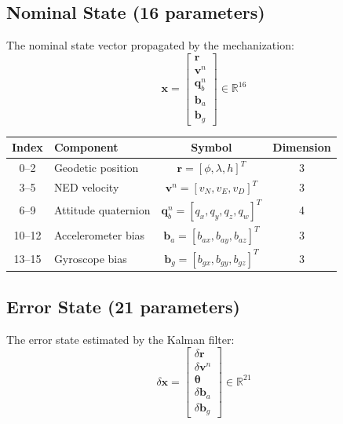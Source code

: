 \documentclass[11pt,a4paper]{article}
\newcommand{\mat}[1]{\mathbf{#1}}
\newcommand{\vect}[1]{\boldsymbol{#1}}
\newcommand{\quat}[1]{\mathbf{#1}}
\newcommand{\Rn}{\mathbb{R}}
\begin{document}
\subsection{Nominal State (16 parameters)}

The nominal state vector propagated by the mechanization:
\begin{equation}
    \mat{x} = \begin{bmatrix} \mat{r} \\ \mat{v}^n \\ \quat{q}_b^n \\ \mat{b}_a \\ \mat{b}_g \end{bmatrix} \in \Rn^{16}
\end{equation}

\begin{center}
\begin{tabular}{clcc}
    \toprule
    Index & Component & Symbol & Dimension \\
    \midrule
    0--2 & Geodetic position & $\mat{r} = [\phi, \lambda, h]^T$ & 3 \\
    3--5 & NED velocity & $\mat{v}^n = [v_N, v_E, v_D]^T$ & 3 \\
    6--9 & Attitude quaternion & $\quat{q}_b^n = [q_x, q_y, q_z, q_w]^T$ & 4 \\
    10--12 & Accelerometer bias & $\mat{b}_a = [b_{ax}, b_{ay}, b_{az}]^T$ & 3 \\
    13--15 & Gyroscope bias & $\mat{b}_g = [b_{gx}, b_{gy}, b_{gz}]^T$ & 3 \\
    \bottomrule
\end{tabular}
\end{center}

\subsection{Error State (21 parameters)}

The error state estimated by the Kalman filter:
\begin{equation}
    \delta\mat{x} = \begin{bmatrix} \delta\mat{r} \\ \delta\mat{v}^n \\ \vect{\theta} \\ \delta\mat{b}_a \\ \delta\mat{b}_g \end{bmatrix} \in \Rn^{21}
\end{equation}
\end{document}

